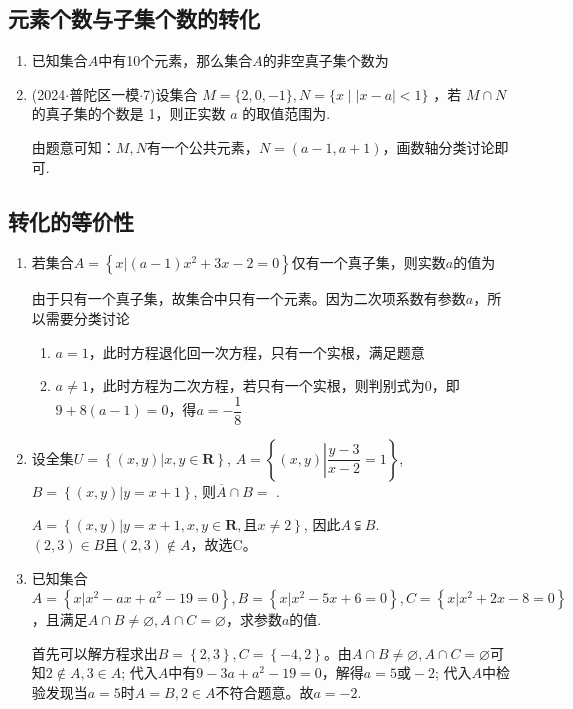 \subsection*{元素个数与子集个数的转化}
\begin{enumerate}
    \item 已知集合$A$中有10个元素，那么集合$A$的非空真子集个数为
    \item (2024$\cdot$普陀区一模$\cdot$7)设集合 $M = \{ 2,0, - 1\} ,N = \{ x \mid  \left| {x - a}\right|  < 1\}$ ，若 $M \cap  N$ 的真子集的个数是 1，则正实数 $a$ 的取值范围为.
    \begin{jieda}
        由题意可知：$M,N$有一个公共元素，$N = (a-1, a+1)$，画数轴分类讨论即可.
    \end{jieda}
\end{enumerate}
\subsection*{转化的等价性}
\begin{enumerate}
    \item 若集合$A = \left\{x | (a-1)x^2+3x-2 = 0\right\}$仅有一个真子集，则实数$a$的值为
    \begin{jieda}
        由于只有一个真子集，故集合中只有一个元素。因为二次项系数有参数$a$，所以需要分类讨论
        \begin{enumerate}
            \item $a = 1$，此时方程退化回一次方程，只有一个实根，满足题意  
            \item $a \neq 1$，此时方程为二次方程，若只有一个实根，则判别式为0，即$9 + 8(a-1) = 0$，得$a = -\dfrac{1}{8}$
        \end{enumerate}
    \end{jieda}
    \item 设全集$U = \left\{(x, y) | x, y \in \mathbf{R}\right\}$, $A = \left\{(x, y) \left| \dfrac{y-3}{x-2}=1\right. \right\}$, $B = \left\{(x, y) | y=x+1\right\}$, 则$\overline{A}\cap B = $ .
    \begin{jieda}
        $A = \left\{(x, y) | y=x+1, x, y \in \mathbf{R}, 且x \neq 2\right\}$, 因此$A \subsetneqq B$. $(2, 3) \in B \mbox{且} (2, 3) \notin A$，故选C。
    \end{jieda}
    \item 已知集合$A = \left\{x | x^2 - ax + a^2 - 19 = 0\right\}, B = \left\{x|x^2-5x+6=0\right\}, C = \left\{x | x^2 + 2x - 8 = 0\right\}$，且满足$A \cap B \neq \varnothing, A \cap C = \varnothing$，求参数$a$的值.
    \begin{jieda}
        首先可以解方程求出$B = \left\{2,3\right\}, C = \left\{-4,2\right\}$。由$A \cap B \neq \varnothing, A \cap C = \varnothing$可知$2 \notin A, 3 \in A$; 代入$A$中有$9 - 3a + a^2 - 19 = 0$，解得$a = 5 \mbox{或} -2$; 代入$A$中检验发现当$a = 5$时$A = B, 2 \in A$不符合题意。故$a = -2$.
    \end{jieda}
\end{enumerate}

